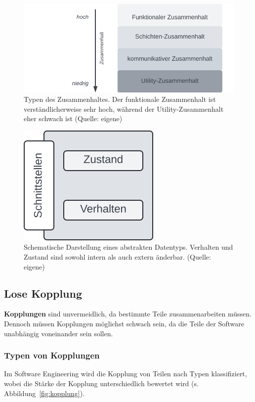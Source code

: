 \begin{figure}
    \centering
    \includegraphics[scale=0.4]{part two/Objektorientierter Entwurf/img/zusammenhalt}
    \caption{Typen des Zusammenhaltes. Der funktionale Zusammenhalt ist verständlicherweise sehr hoch, während der Utility-Zusammenhalt eher schwach ist (Quelle: eigene)}
    \label{fig:zusammenhalt}
\end{figure}


\begin{figure}
    \centering
    \includegraphics[scale=0.4]{part two/Objektorientierter Entwurf/img/adt}
    \caption{Schematische Darstellung eines abstrakten Datentyps. Verhalten und Zustand sind sowohl intern als auch extern änderbar.  (Quelle: eigene)}
    \label{fig:adt}
\end{figure}

\subsection{Lose Kopplung}
\textbf{Kopplungen} sind unvermeidlich, da bestimmte Teile zusammenarbeiten müssen.\\
Dennoch müssen Kopplungen möglichst schwach sein, da die Teile der Software unabhängig voneinander sein sollen.

\subsubsection*{Typen von Kopplungen}
Im Software Engineering wird die Kopplung von Teilen nach Typen klassifiziert, wobei die Stärke der Kopplung unterschiedlich bewertet wird (s. Abbildung~\ref{fig:kopplung}).

